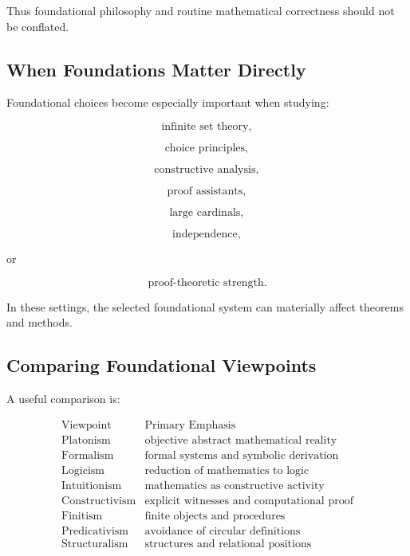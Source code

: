 Thus foundational philosophy and routine mathematical correctness should
not be conflated.

\subsection{When Foundations Matter Directly}
\label{subsec:when-foundations-matter}

Foundational choices become especially important when studying:

\[
\boxed{
\text{infinite set theory},
}
\]

\[
\boxed{
\text{choice principles},
}
\]

\[
\boxed{
\text{constructive analysis},
}
\]

\[
\boxed{
\text{proof assistants},
}
\]

\[
\boxed{
\text{large cardinals},
}
\]

\[
\boxed{
\text{independence},
}
\]

or

\[
\boxed{
\text{proof-theoretic strength}.
}
\]

In these settings, the selected foundational system can materially affect
theorems and methods.

\subsection{Comparing Foundational Viewpoints}
\label{subsec:comparing-foundational-viewpoints}

A useful comparison is:

\[
\boxed{
\begin{array}{c|c}
\text{Viewpoint} & \text{Primary Emphasis}\\
\hline
\text{Platonism} & \text{objective abstract mathematical reality}\\
\text{Formalism} & \text{formal systems and symbolic derivation}\\
\text{Logicism} & \text{reduction of mathematics to logic}\\
\text{Intuitionism} & \text{mathematics as constructive activity}\\
\text{Constructivism} & \text{explicit witnesses and computational proof}\\
\text{Finitism} & \text{finite objects and procedures}\\
\text{Predicativism} & \text{avoidance of circular definitions}\\
\text{Structuralism} & \text{structures and relational positions}
\end{array}
}
\]

